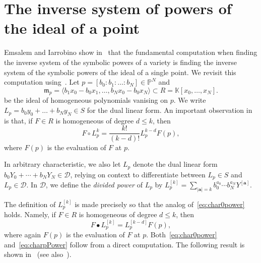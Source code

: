 \documentclass[12pt, reqno]{amsart}
\numberwithin{equation}{section}
\newcommand{\ba}{\mathbf{a}}
\newcommand{\fm}{{\mathfrak m}}
\newcommand{\kk}{\mathbb{K}}
\newcommand{\contract}{\bullet}
\theoremstyle{plain} %
\theoremstyle{definition}
\theoremstyle{remark}
\begin{document}
\section{The inverse system of powers of the ideal of a point}
Emsalem and Iarrobino show in~\cite{EI95} that
the fundamental computation when finding the inverse system of the symbolic powers of a variety is finding the inverse system of the symbolic powers of the ideal of a single point.  We revisit this computation using~.  Let $p=[b_0:b_1:\ldots:b_N]\in\mathbb{P}^N$ and
\[
\fm_p=\langle b_1x_0-b_0x_1,\ldots,b_Nx_0-b_0x_N\rangle\subset R=\kk[x_0,\ldots,x_N].
\]
be the ideal of homogeneous polynomials vanising on $p$.  We write $L_p=b_0y_0+\ldots+b_Ny_N\in S$ for the dual linear form.  An important observation in~\cite{EI95} is that, if $F\in R$ is homogeneous of degree $d\le k$, then
\begin{equation}\label{eq:char0power}
F\circ L_p^k=\frac{k!}{(k-d)!}L_p^{k-d}F(p),
\end{equation}
where $F(p)$ is the evaluation of $F$ at $p$.

In arbitrary characteristic, we also let $L_p$ denote the dual linear form $b_0Y_0+\cdots+b_NY_N\in\mathcal{D}$, relying on context to differentiate between $L_p\in S$ and $L_p\in\mathcal{D}$.  In $\mathcal{D}$, we define the \textit{divided power} of $L_p$ by
$L_p^{[k]}=\sum_{|\ba|=k} b_0^{a_0}\cdots b_N^{a_N}Y^{[\ba]}.$

The definition of $L_p^{[k]}$ is made precisely so that the analog of~\eqref{eq:char0power} holds.  Namely, if $F\in R$ is homogeneous of degree $d\le k$, then
\begin{equation}
\label{eq:charpPower}
F\contract L_p^{[k]}=L_p^{[k-d]}F(p),
\end{equation}
where again $F(p)$ is the evaluation of $F$ at $p$.  Both~\eqref{eq:char0power} and~\eqref{eq:charpPower} follow from a direct computation.  The following result is shown in~\cite{EI95} (see also~\cite{Ger95}).
\end{document}
